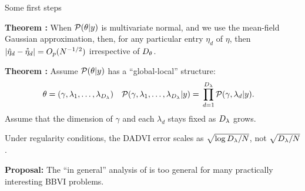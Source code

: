 \documentclass[8pt]{beamer}\usepackage[]{graphicx}\usepackage[]{color}
\begin{document}

\begin{frame}{Some first steps}

\noindent
\textbf{Theorem \citep{giordano:2023:dadvi}:} When $\mathcal{P}(\theta \vert y)$ is multivariate
normal, and we use the mean-field Gaussian approximation, then, for any
particular entry $\eta_d$ of $\eta$, then $\left| \hat{\eta}_d - \accentset{*}{\eta}_d\right| =
O_p(N^{-1/2})$ irrespective of ${D_{\theta}}$.

\pause
\vspace{2em}
\noindent
\textbf{Theorem \citep{giordano:2023:dadvi}:} Assume $\mathcal{P}(\theta \vert y)$ has a ``global-local''
structure:
%
\begin{align*}
\theta ={}& (\gamma, \lambda_1, \ldots, \lambda_{D_{\lambda}}) &
\mathcal{P}(\gamma, \lambda_1, \ldots, \lambda_{D_{\lambda}} | y) ={}&
\prod_{d=1}^{{D_{\lambda}}} \mathcal{P}(\gamma, \lambda_d \vert y).
\end{align*}
%
Assume that the dimension of $\gamma$ and each $\lambda_d$ stays fixed as
${D_{\lambda}}$ grows.

Under regularity conditions, the DADVI error
scales as $\sqrt{\log {D_{\lambda}} / N}$, not $\sqrt{{D_{\lambda}} / N}$.

\vspace{2em}

\pause
\noindent
\textbf{Proposal: }  The ``in general'' analysis of \citep{nemirovski:2009:sgdvsfixed}
is too general for many practically interesting BBVI problems.

\end{frame}

\end{document}
